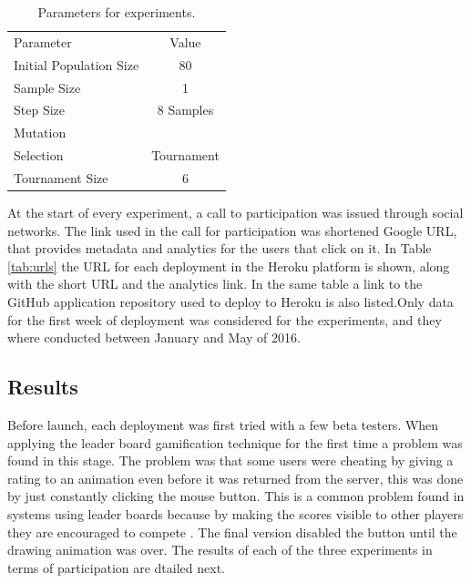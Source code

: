 \begin{table}
  \small
  \caption{ Parameters for experiments.  }
  \label{tab:params} 
  \centering
  \small
  \begin{tabular}{l  c}
    \hline\noalign{\smallskip}
     Parameter & Value \\
    \noalign{\smallskip}\hline\noalign{\smallskip}
    Initial Population Size   & 80 \\ \hline
    Sample Size & 1 \\ \hline
    Step Size & 8 Samples \\ \hline
    Mutation &  \\ \hline
    Selection & Tournament \\ \hline
    Tournament Size &  6 \\ \hline
  \end{tabular}
\end{table}

At the start of every experiment, a call to participation was issued
through social networks.  The link used in the call for participation
was shortened Google URL, that provides metadata and analytics for the
users that click on it.  In Table \ref{tab:urls} the URL for each 
deployment in the Heroku platform is shown,
along with the short URL and the analytics link. In the same table a link to the GitHub 
application repository used to deploy to Heroku is also listed.Only data 
for the first week of deployment was considered for the experiments, and they where conducted 
between January and May of 2016. 

\subsection{Results} 
Before launch, each deployment was first tried with a few beta testers. 
When applying the leader board gamification technique for the first time a 
problem was found in this stage. The problem was that some users were cheating by giving a
rating to an animation even before it was returned from the server, this was done by just
constantly clicking the mouse button. This is a common problem found in systems using leader
boards because by making the scores visible to other players they are encouraged 
to compete \cite{hickman2010total}. The final version disabled the button until 
the drawing animation was over. The results of each of the three experiments in 
terms of participation are dtailed next.

